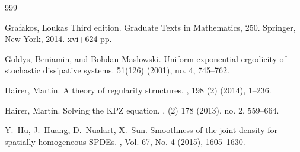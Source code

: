 \documentclass[a4paper,11pt]{article}
\theoremstyle{plain}
\theoremstyle{definition}
\numberwithin{NQ}{section}
\numberwithin{LQ}{section}
\numberwithin{ZQ}{section}
\begin{document}
\begin{small}
\begin{thebibliography}{999}
		
%


Grafakos, Loukas
 Third edition. 
\newblock Graduate Texts in Mathematics, 250. Springer, New York, 2014. xvi+624 pp.

Goldys, Beniamin, and Bohdan Maslowski.
\newblock Uniform exponential ergodicity of stochastic dissipative systems. 
 51(126) (2001), no. 4, 745--762. 

Hairer, Martin.
\newblock A theory of regularity structures.
, 198 (2) (2014), 1--236.

Hairer, Martin.
\newblock Solving the KPZ equation.
, (2) 178 (2013), no. 2, 559--664.




Y.~Hu, J.~Huang, D.~Nualart, X.~Sun.
\newblock Smoothness of the joint density for spatially homogeneous SPDEs.
,
Vol. 67, No. 4 (2015), 1605--1630.

%
% 





%


\end{thebibliography}
\end{small}
\end{document}
